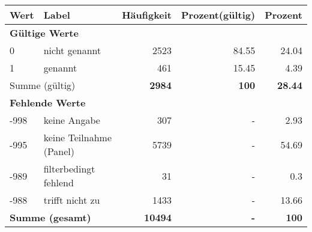     \begin{longtable}{lXrrr}
     \toprule
     \textbf{Wert} & \textbf{Label} & \textbf{Häufigkeit} & \textbf{Prozent(gültig)} & \textbf{Prozent} \\
     \endhead
     \midrule
     \multicolumn{5}{l}{\textbf{Gültige Werte}}\\

     0 &
     \multicolumn{1}{X}{ nicht genannt   } &


       \num{2523} &
       \num[round-mode=places,round-precision=2]{84,55} &
         \num[round-mode=places,round-precision=2]{24,04} \\

     1 &
     \multicolumn{1}{X}{ genannt   } &


       \num{461} &
       \num[round-mode=places,round-precision=2]{15,45} &
         \num[round-mode=places,round-precision=2]{4,39} \\
     \midrule
     \multicolumn{2}{l}{Summe (gültig)} &
       \textbf{\num{2984}} &
     \textbf{100} &
       \textbf{\num[round-mode=places,round-precision=2]{28,44}} \\
     \multicolumn{5}{l}{\textbf{Fehlende Werte}}\\
       -998 &
       keine Angabe &
         \num{307} &
        - &
         \num[round-mode=places,round-precision=2]{2,93} \\
       -995 &
       keine Teilnahme (Panel) &
         \num{5739} &
        - &
         \num[round-mode=places,round-precision=2]{54,69} \\
       -989 &
       filterbedingt fehlend &
         \num{31} &
        - &
         \num[round-mode=places,round-precision=2]{0,3} \\
       -988 &
       trifft nicht zu &
         \num{1433} &
        - &
         \num[round-mode=places,round-precision=2]{13,66} \\
     \midrule
     \multicolumn{2}{l}{\textbf{Summe (gesamt)}} &
          \textbf{\num{10494}} &
        \textbf{-} &
        \textbf{100} \\
     \bottomrule
     \end{longtable}
     
